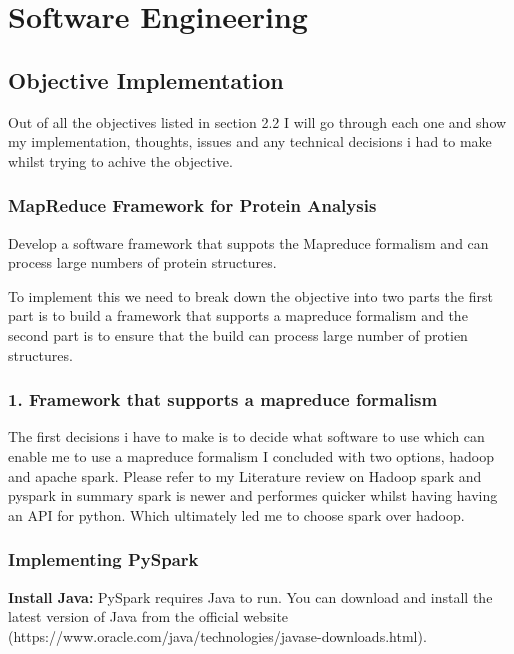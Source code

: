 \documentclass[]{final_report}
\begin{document}
\section{Software Engineering}
\subsection{Objective Implementation}

Out of all the objectives listed in section 2.2 I will go through each one and show my implementation, thoughts, issues and any technical decisions i had to make whilst trying to achive the objective.

\subsubsection{MapReduce Framework for Protein Analysis}

\begin{displayquote}
    Develop a software framework that suppots the Mapreduce formalism and can process
    large numbers of protein structures.
\end{displayquote}

To implement this we need to break down the objective into two parts the first part is to build a framework that supports a mapreduce formalism and the second part is to ensure that the build can process large number of protien structures. 

\subsubsection{1. Framework that supports a mapreduce formalism}

The first decisions i have to make is to decide what software to use which can enable me to use a mapreduce formalism I concluded with two options, hadoop and apache spark. Please refer to my Literature review on Hadoop spark and pyspark in summary spark is newer and performes quicker whilst having having an API for python. Which ultimately led me to choose spark over hadoop.

\clearpage

\subsubsection{Implementing PySpark}

\textbf{Install Java:} PySpark requires Java to run. You can download and install the latest version of Java from the official website (https://www.oracle.com/java/technologies/javase-downloads.html).
\end{document}
